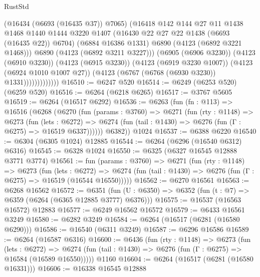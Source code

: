 \begin{lexlean}{RustStd}
\begin{coremodule}
                            (@16434 (@6693 (@16435 @37)) @7065)
                            (@16418
                              @142
                              @144
                              @27
                              @11
                              @1438
                              @1468
                              @1440
                              @1444
                              @3220
                              @1407
                              (@16430 @22 @27 @22 @1438 (@6693 (@16435 @22)) @6704)
                              (@6884 @16386 @1331)
                              @6890
                              (@4123 (@6892 @3221 @1468)))
                            @6890
                            (@4123 (@6892 @3211 @3227)))
                          (@6905 (@6906 @3230))
                          (@4123 (@6910 @3230))
                          (@4123 (@6915 @3230))
                          (@4123 (@6919 @3230 @1007))
                          (@4123 (@6924 @1010 @1007 @27))
                          (@4123 (@6767 (@6768 (@6930 @3230)) @1331)))))))))))))
@16510 := @6247 @520
@16514 := @6249 (@6253 @520) (@6259 @520)
@16516 := @6264 (@6218 @6265)
@16517 := @3767 @5605
@16519 := @6264 (@16517 @6292)
@16536 := @6263
    (fun (fn : @113) =>
    @16516
      (@6268
        (@6270
          (fun (params : @3760) =>
          @6271
            (fun (rty : @1148) =>
            @6273
              (fun (lets : @6272) =>
              @6274 (fun (tail : @1430) => @6276 (fun (Γ : @6275) => @16519 @6337))))))
        @6382))
    @1024
@16537 := @6388 @6220
@16540 := @6304 (@6305 @1024) @12885
@16544 := @6264 (@6296 (@16540 @6312) @6316)
@16545 := @6328 @1024
@16550 := @6325 (@6327 @16545 @12888 @3771 @3774)
@16561 := fun (params : @3760) =>
  @6271
    (fun (rty : @1148) =>
    @6273
      (fun (lets : @6272) =>
      @6274 (fun (tail : @1430) => @6276 (fun (Γ : @6275) => @16519 (@16544 @16550)))))
@16562 := @6270 @16561
@16563 := @6268 @16562
@16572 := @6351
    (fun (U : @6350) => @6352 (fun (t : @7) => @6359 (@6264 (@6365 @12885 @3777) @6376)))
@16575 := @16537 (@16563 @16572) @12883
@16577 := @6249 @16562 @16572
@16579 := @6433 @16561 @3249
@16580 := @6282 @3249
@16584 := @6264 (@16517 (@6281 (@16580 @6290)))
@16586 := @16540 (@6311 @3249)
@16587 := @6296 @16586
@16589 := @6264 (@16587 @6316)
@16600 := @6436
    (fun (rty : @1148) =>
    @6273
      (fun (lets : @6272) =>
      @6274 (fun (tail : @1430) => @6276 (fun (Γ : @6275) => @16584 (@16589 @16550)))))
    @1160
@16604 := @6264 (@16517 (@6281 (@16580 @16331)))
@16606 := @16338 @16545 @12888

\end{coremodule}
\end{lexlean}
